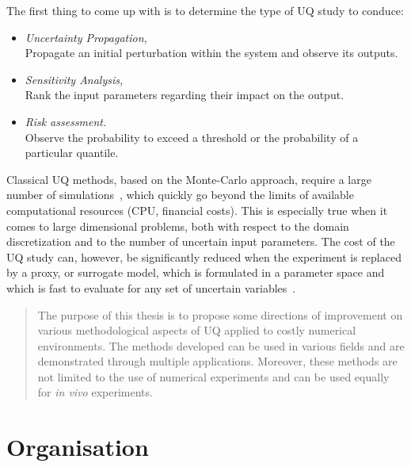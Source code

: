  
 The first thing to come up with is to determine the type of UQ study to conduce:

\begin{itemize}
	\item \emph{Uncertainty Propagation,}\hfill\\
Propagate an initial perturbation within the system and observe its outputs.
	\item \emph{Sensitivity Analysis,}\hfill\\
Rank the input parameters regarding their impact on the output.
	\item \emph{Risk assessment.}\hfill\\
Observe the probability to exceed a threshold or the probability of a particular quantile.
\end{itemize}

Classical UQ methods, based on the Monte-Carlo approach, require a large number of simulations~\cite{saltelli2007}, which quickly go beyond the limits of available computational resources (CPU, financial costs). This is especially true when it comes to large dimensional problems, both with respect to the domain discretization and to the number of uncertain input parameters. The cost of the UQ study can, however, be significantly reduced when the experiment is replaced by a proxy, or surrogate model, which is formulated in a parameter space and which is fast to evaluate for any set of uncertain variables~\cite{martin2005}. 

\begin{quotation}

{\selectfont

The purpose of this thesis is to propose some directions of improvement on various methodological aspects of UQ applied to costly numerical environments. The methods developed can be used in various fields and are demonstrated through multiple applications. Moreover, these methods are not limited to the use of numerical experiments and can be used equally for \emph{in vivo} experiments.

}
\end{quotation}


\newpage

\section*{Organisation}


